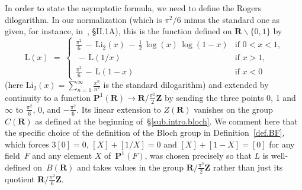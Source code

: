 \documentclass[12pt,reqno]{amsart}
\theoremstyle{definition}
\newcommand{\changed}[1]{{#1}}
\def\m{\,-\,}
\def\={\;=\;}
\def\Z{\mathbf Z}   %
\def\R{\mathbf R}   %
\def\BP{\mathbf P}
\def\P{\BP}
\def\L{\mathrm L}
\def\ssm{\smallsetminus}
\def\Li{\mathrm{Li}}
\begin{document}
In order to state the asymptotic formula, we need to define the 
Rogers dilogarithm. In our normalization (which is $\pi^2/6$ minus the
standard one as given, for instance, in~\cite{Zagier}, {\S}II.1A),
this is the function defined on $\R\ssm\{0,1\}$ by
\begin{equation} \label{normalization}
\L(x) \= 
\begin{cases}
\frac{\pi^2}6 \m \Li_2(x) \m\frac12\,\log(x)\,\log(1-x) & \text{if $0<x<1$,}\\
\m \L(1/x) & \text{if $x>1$,} \\  \frac{\pi^2}6 \m \L(1-x) & \text{if $x<0$}
\end{cases}
\end{equation}
(here $\Li_2(x)=\sum_{n=1}^\infty\frac{x^n}{n^2}$ is the standard dilogarithm)
and extended by continuity to a function $\P^1(\R)\to\R/\frac{\pi^2}2\Z$ by 
sending the three points $0$, 1 and~$\infty$ to $\frac{\pi^2}6$, 0, and 
$-\frac{\pi^2}6$. Its linear extension to $Z(\R)$ vanishes on the group 
$C(\R)$ as defined at the beginning of~\S\ref{sub.intro.bloch}. \changed{We comment 
here that the specific choice of the definition of the Bloch group in 
Definition~\ref{def.BF}, which forces $3[0]=0$, $[X]+[1/X]=0$ and 
$[X]+[1-X]=[0]$ for any field~$F$ and any element $X$ of~$\P^1(F)$,
was chosen precisely so that $L$ is well-defined on~$B(\R)$ and takes values 
in the group $\R/\frac{\pi^2}2\Z$ rather than just its
quotient $\R/\frac{\pi^2}6\Z$.}
\end{document}
